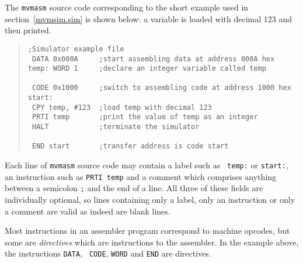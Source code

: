 The {\tt mvmasm} source code corresponding to the short example used in
section~\ref{mvmsim.sim} is shown below: a
variable is loaded with decimal 123 and then printed.
\begin{quote}
\begin{minipage}{30cm}
\footnotesize
\begin{verbatim}
;Simulator example file
 DATA 0x000A     ;start assembling data at address 000A hex
temp: WORD 1     ;declare an integer variable called temp

 CODE 0x1000     ;switch to assembling code at address 1000 hex
start:
 CPY temp, #123  ;load temp with decimal 123
 PRTI temp       ;print the value of temp as an integer
 HALT            ;terminate the simulator

 END start       ;transfer address is code start
\end{verbatim}
\end{minipage}
\end{quote}

Each line of {\tt mvmasm} source code may contain a label such as {\tt
temp:} or {\tt start:}, an instruction such as {\tt PRTI temp} and a
comment which comprises anything between a semicolon {\tt ;} and the end
of a line. All three of these fields are individually optional, so lines
containing only a label, only an instruction or only a comment are
valid as indeed are blank lines.

Most instructions in an assembler program correspond to machine opcodes,
but some are {\em directives} which are instructions to the
assembler. In the example above, the instructions {\tt DATA}, {\tt
CODE}, {\tt WORD} and {\tt END} are directives.

